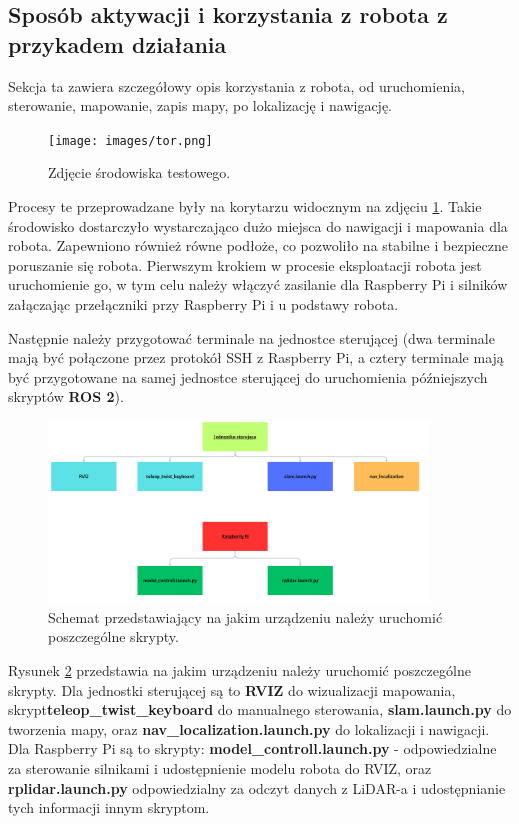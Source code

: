 \documentclass[a4paper,twoside,12pt]{book}
\begin{document}
\subsection{Sposób aktywacji i korzystania z robota z przykadem działania}
Sekcja ta zawiera szczegółowy opis korzystania z robota, od uruchomienia, sterowanie, mapowanie, zapis mapy, po lokalizację i nawigację.

\begin{figure}[!hb]
	\centering
	\texttt{[image: images/tor.png]}
	\caption{Zdjęcie środowiska testowego.}
	\label{fig:test}
	\end{figure}
Procesy te przeprowadzane były na korytarzu widocznym na zdjęciu \ref{fig:test}. Takie środowisko dostarczyło wystarczająco dużo miejsca do nawigacji i mapowania dla robota. Zapewniono również równe podłoże, co pozwoliło na stabilne i bezpieczne poruszanie się robota.
\newline \newline
Pierwszym krokiem w procesie eksploatacji robota jest uruchomienie go, w tym celu należy włączyć zasilanie dla Raspberry Pi i silników załączając przełączniki przy Raspberry Pi i u podstawy robota.
\newpage

Następnie należy przygotować terminale na jednostce sterującej (dwa terminale mają być połączone przez protokół SSH z Raspberry Pi, a cztery terminale mają być przygotowane na samej jednostce sterującej do uruchomienia późniejszych skryptów \textbf{ROS 2}).

\begin{figure}[!hb]
	\centering
	\includegraphics[width=0.9\textwidth]{images/diagram-cogdzie.png}
	\caption{Schemat przedstawiający na jakim urządzeniu należy uruchomić poszczególne skrypty.}
	\label{fig:schematerminali}
	\end{figure}
	

Rysunek \ref{fig:schematerminali} przedstawia na jakim urządzeniu należy uruchomić poszczególne skrypty. Dla jednostki sterującej są to \textbf{RVIZ} do wizualizacji mapowania, skrypt\newline \textbf{teleop\_twist\_keyboard} do manualnego sterowania, \textbf{slam.launch.py} do tworzenia mapy, oraz \textbf{nav\_localization.launch.py} do lokalizacji i nawigacji. Dla Raspberry Pi są to skrypty: \textbf{model\_controll.launch.py} - odpowiedzialne za sterowanie silnikami i udostępnienie modelu robota do RVIZ, oraz \textbf{rplidar.launch.py} odpowiedzialny za odczyt danych z LiDAR-a i udostępnianie tych informacji innym skryptom.
\end{document}
